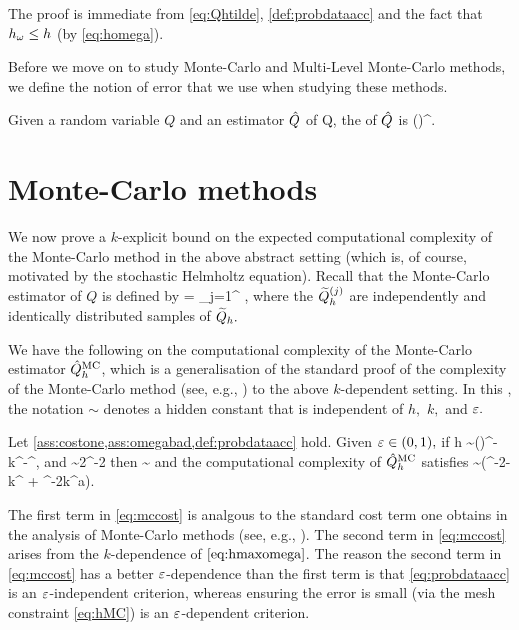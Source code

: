 The proof is immediate from \cref{eq:Qhtilde}, \cref{def:probdataacc} and the fact that $h_{\omega} \leq h$ (by \cref{eq:homega}).
\epf

Before we move on to study Monte-Carlo and Multi-Level Monte-Carlo methods, we define the notion of error that we use when studying these methods.

\label{def:rmse}
Given a random variable $Q$ and an estimator $\hat{Q}$ of Q, the  of $\hat{Q}$ is
\beqs
\err{\Qhat} \de \mleft(\mright)^{\half}.
\eeqs
\ede

\section{Monte-Carlo methods}\label{sec:mc}

We now prove a $k$-explicit bound on the expected computational complexity of the Monte-Carlo method in the above abstract setting (which is, of course, motivated by the stochastic Helmholtz equation). Recall that the Monte-Carlo estimator of $Q$ is defined by
\beqs
\QhatMC =  \sum_{j=1}^{\NMC} \Qhtildesj,
\eeqs
where the $\widetilde{Q}_{h}^{(j)}$ are independently and identically distributed samples of $\widetilde{Q}_{h}.$

We have the following  on the computational complexity of the Monte-Carlo estimator $\hat{Q}^{\mathrm{MC}}_{h}$, which is a generalisation of the standard proof of the complexity of the Monte-Carlo method (see, e.g., \cite[Section 2.1]{ClGiScTe:11}) to the above $k$-dependent setting. In this , the notation $\sim$ denotes a hidden constant that is independent of $h,$ $k,$ and $\varepsilon.$

\label{thm:hhmc}
Let \cref{ass:costone,ass:omegabad,def:probdataacc} hold. Given $\varepsilon \in (0,1),$ if
\beq\label{eq:hMC}
h \sim \mleft(\co\mright)^{-}k^{-\frac\sigma\alpha}\eps^{},
\eeq
and
\beq\label{eq:NMC}
\NMC  \sim 2\VAR{\Qhtilde}\eps^{-2}
\eeq
then
\beq\label{eq:mcerror}
\err{\QhatMC} \sim \eps
\eeq
and the computational complexity of $\hat{Q}^{\mathrm{MC}}_{h}$ satisfies
\beq\label{eq:mccost}
\EXP{\CMC} \sim \VAR{\Qhtilde}\mleft(\eps^{-2-\frac{\gamma}{\alpha}}k^{\frac{\gamma\sigma}\alpha} + \eps^{-2}k^{a\gamma}\mright).
\eeq
\enth

The first term in \cref{eq:mccost} is analgous to the standard cost term one obtains in the analysis of Monte-Carlo methods (see, e.g., \cite[Section 2.1]{ClGiScTe:11}). The second term in \cref{eq:mccost} arises from the $k$-dependence of $\cref{eq:hmaxomega}$. The reason the second term in \cref{eq:mccost} has a better $\varepsilon$-dependence than the first term is that \cref{eq:probdataacc} is an $\varepsilon$-independent criterion, whereas ensuring the error is small (via the mesh constraint \cref{eq:hMC}) is an $\varepsilon$-dependent criterion.

